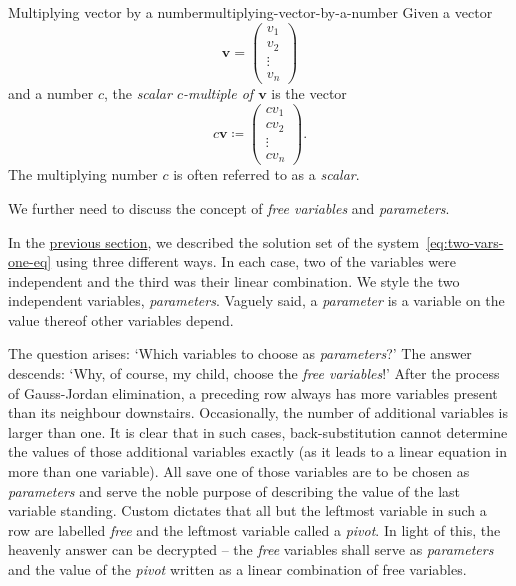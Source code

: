 \begin{definition}{Multiplying vector by a number}{multiplying-vector-by-a-number}
 Given a vector
 \[
  \mathbf{v} = 
  \begin{pmatrix}
   v_1\\
   v_2\\
   \vdots\\
   v_n
  \end{pmatrix}
 \]
 and a number $c$, the \emph{scalar $c$-multiple of $\mathbf{v}$} is the vector
 \[
  c \mathbf{v} \coloneqq 
  \begin{pmatrix}
   cv_1\\
   cv_2\\
   \vdots\\
   cv_n
  \end{pmatrix}.
 \]
 The multiplying number $c$ is often referred to as a \emph{scalar}.
\end{definition}

We further need to discuss the concept of \emph{free variables} and
\emph{parameters}.

In the \hyperref[sec:visualization]{previous section}, we described the solution
set of the system~\eqref{eq:two-vars-one-eq} using three different ways. In each
case, two of the variables were independent and the third was their linear
combination. We style the two independent variables, \emph{parameters}. Vaguely
said, a \emph{parameter} is a variable on the value thereof other variables
depend.

The question arises: `Which variables to choose as \emph{parameters}?' The
answer descends: `Why, of course, my child, choose the \emph{free variables}!'
After the process of Gauss-Jordan elimination, a preceding row always has more
variables present than its neighbour downstairs. Occasionally, the number of
additional variables is larger than one. It is clear that in such cases,
back-substitution cannot determine the values of those additional variables
exactly (as it leads to a linear equation in more than one variable). All save
one of those variables are to be chosen as \emph{parameters} and serve the noble
purpose of describing the value of the last variable standing. Custom dictates
that all but the leftmost variable in such a row are labelled \emph{free} and
the leftmost variable called a \emph{pivot}. In light of this, the heavenly
answer can be decrypted -- the \emph{free} variables shall serve as
\emph{parameters} and the value of the \emph{pivot} written as a linear
combination of free variables.

